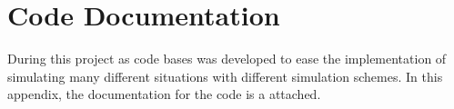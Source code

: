 \chapter{Code Documentation}\label{chap:code_documentation}
During this project as code bases was developed to ease the implementation of simulating many different situations with different simulation schemes. In this appendix, the documentation for the code is a attached.





